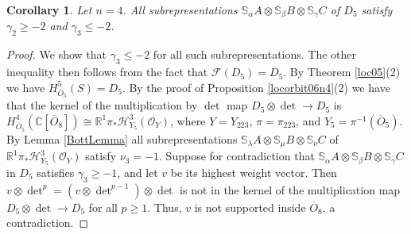 \documentclass[11pt,reqno]{amsart}
\newcommand{\oo}{\otimes}
\newcommand{\bS}{\mathbb{S}}
\newcommand{\C}{\mathbb{C}}
\renewcommand{\det}{\operatorname{det}}
\newcommand{\mc}[1]{\mathcal{#1}}
\newcommand{\ol}[1]{\overline{#1}}
\newtheorem{corollary}[theorem]{Corollary}
\numberwithin{equation}{section}
\begin{document}
\begin{corollary}\label{cor:weightboundsD5n4}
Let $n=4$. All subrepresentations $\bS_{\alpha}A\oo \bS_{\beta}B\oo \bS_{\gamma}C$ of $D_5$ satisfy $\gamma_2\geq -2$ and $\gamma_3\leq -2$.	
\end{corollary}

\begin{proof}
We show that $\gamma_3\leq -2$ for all such subrepresentations. The other inequality then follows from the fact that $\mc{F}(D_5)=D_5$. By Theorem \ref{loc05}(2) we have $H	^5_{\ol{O}_5}(S)=D_5$. By the proof of Proposition \ref{locorbit06n4}(2) we have that the kernel of the multiplication by $\det$ map $D_5\oo \det\to D_5$ is $H^4_{\ol{O}_5}(\C[\ol{O}_8])\cong \mathbb{R}^1\pi_{\ast}\mathscr{H}^3_{Y_5}(\mc{O}_Y)$, where $Y=Y_{223}$, $\pi=\pi_{223}$, and $Y_5=\pi^{-1}(\ol{O}_5)$. By Lemma \ref{BottLemma} all subrepresentations $\bS_{\lambda}A\oo \bS_{\mu}B\oo \bS_{\nu}C$ of $\mathbb{R}^1\pi_{\ast}\mathscr{H}^3_{Y_5}(\mc{O}_Y)$ satisfy $\nu_3=-1$. Suppose for contradiction that $\bS_{\alpha}A\oo \bS_{\beta}B\oo \bS_{\gamma}C$ in $D_5$ satisfies $\gamma_{3}\geq -1$, and let $v$ be its highest weight vector. Then $v\otimes \det^p=(v\oo \det^{p-1})\oo \det$ is not in the kernel of the multiplication map $D_5\otimes \det \to D_5$ for all $p\geq 1$. Thus, $v$ is not supported inside $\ol{O}_8$, a contradiction.
\end{proof}
\end{document}
